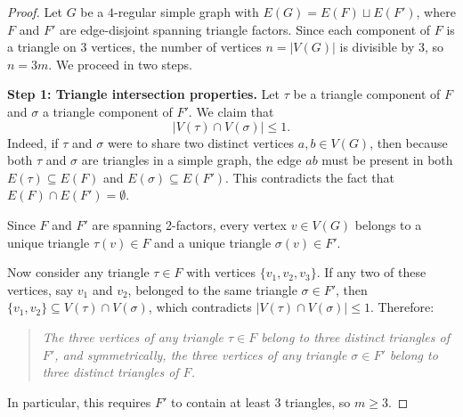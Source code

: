 \documentclass[11pt,reqno]{amsart}
\theoremstyle{definition}
\theoremstyle{remark}
\begin{document}
\begin{proof}
Let $G$ be a $4$-regular simple graph with $E(G) = E(F) \sqcup E(F')$, where $F$ and $F'$ are edge-disjoint spanning triangle factors. Since each component of $F$ is a triangle on 3 vertices, the number of vertices $n = |V(G)|$ is divisible by $3$, so $n = 3m$. We proceed in two steps.

\medskip
\noindent\textbf{Step 1: Triangle intersection properties.}
Let $\tau$ be a triangle component of $F$ and $\sigma$ a triangle component of $F'$. We claim that
\[
|V(\tau) \cap V(\sigma)| \le 1.
\]
Indeed, if $\tau$ and $\sigma$ were to share two distinct vertices $a, b \in V(G)$, then because both $\tau$ and $\sigma$ are triangles in a simple graph, the edge $ab$ must be present in both $E(\tau) \subseteq E(F)$ and $E(\sigma) \subseteq E(F')$. This contradicts the fact that $E(F) \cap E(F') = \emptyset$.

Since $F$ and $F'$ are spanning 2-factors, every vertex $v \in V(G)$ belongs to a unique triangle $\tau(v) \in F$ and a unique triangle $\sigma(v) \in F'$. 

Now consider any triangle $\tau \in F$ with vertices $\{v_1, v_2, v_3\}$. If any two of these vertices, say $v_1$ and $v_2$, belonged to the same triangle $\sigma \in F'$, then $\{v_1, v_2\} \subseteq V(\tau) \cap V(\sigma)$, which contradicts $|V(\tau) \cap V(\sigma)| \le 1$. Therefore:
\begin{quote}
\emph{The three vertices of any triangle $\tau \in F$ belong to three distinct triangles of $F'$, and symmetrically, the three vertices of any triangle $\sigma \in F'$ belong to three distinct triangles of $F$.}
\end{quote}
In particular, this requires $F'$ to contain at least 3 triangles, so $m \ge 3$.


\end{proof}
\end{document}
